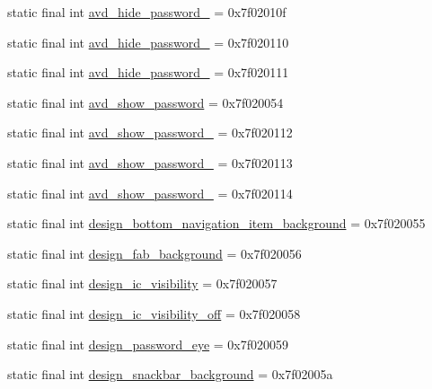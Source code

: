 \begin{CompactItemize}
\item 
static final int \hyperlink{classandroid_1_1support_1_1v4_1_1_r_1_1drawable_9fb7ee6ddfe8051d5b49787322f02f19}{avd\_\-hide\_\-password\_} = 0x7f02010f
\item 
static final int \hyperlink{classandroid_1_1support_1_1v4_1_1_r_1_1drawable_02ae034db4d7557d38d612b8a12759cb}{avd\_\-hide\_\-password\_} = 0x7f020110
\item 
static final int \hyperlink{classandroid_1_1support_1_1v4_1_1_r_1_1drawable_5064cf6b6d036321532281f071e49abd}{avd\_\-hide\_\-password\_} = 0x7f020111
\item 
static final int \hyperlink{classandroid_1_1support_1_1v4_1_1_r_1_1drawable_bc08a2ec58900bfa0f889c5e889da94d}{avd\_\-show\_\-password} = 0x7f020054
\item 
static final int \hyperlink{classandroid_1_1support_1_1v4_1_1_r_1_1drawable_d8aa07a42f934f5ef98f11551887b253}{avd\_\-show\_\-password\_} = 0x7f020112
\item 
static final int \hyperlink{classandroid_1_1support_1_1v4_1_1_r_1_1drawable_4663d387716f8c87abb50fc782c985ef}{avd\_\-show\_\-password\_} = 0x7f020113
\item 
static final int \hyperlink{classandroid_1_1support_1_1v4_1_1_r_1_1drawable_f0a10e65985712f924a63bf02a3931ca}{avd\_\-show\_\-password\_} = 0x7f020114
\item 
static final int \hyperlink{classandroid_1_1support_1_1v4_1_1_r_1_1drawable_e71084b6ad31d063a31ad6b22ecf9bcb}{design\_\-bottom\_\-navigation\_\-item\_\-background} = 0x7f020055
\item 
static final int \hyperlink{classandroid_1_1support_1_1v4_1_1_r_1_1drawable_79be7d75bc46ca8708399db3701c82cc}{design\_\-fab\_\-background} = 0x7f020056
\item 
static final int \hyperlink{classandroid_1_1support_1_1v4_1_1_r_1_1drawable_744c83d6a672f91acb16f6bfa58fc396}{design\_\-ic\_\-visibility} = 0x7f020057
\item 
static final int \hyperlink{classandroid_1_1support_1_1v4_1_1_r_1_1drawable_b9d56c3c9df27fcd6fcc8c4a84e0de38}{design\_\-ic\_\-visibility\_\-off} = 0x7f020058
\item 
static final int \hyperlink{classandroid_1_1support_1_1v4_1_1_r_1_1drawable_a4b3553538634c0fb56e2d42e2633e25}{design\_\-password\_\-eye} = 0x7f020059
\item 
static final int \hyperlink{classandroid_1_1support_1_1v4_1_1_r_1_1drawable_dc67f80bb7cab80c4c9c0c96a1bab50c}{design\_\-snackbar\_\-background} = 0x7f02005a

\end{CompactItemize}
